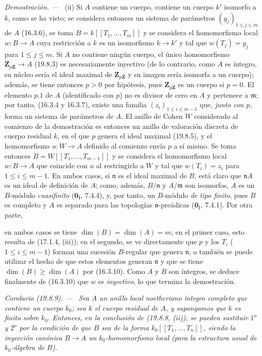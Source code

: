 \documentclass[10pt,oneside]{book}
\makeatletter
\newcommand{\setmanualcurrentlabel}[1]{\def\@currentlabel{#1}}
\newcommand{\oldpage}[2][]{%
  \setcounter{footnote}{0}%
  \marginpar{\scriptsize\textbf{#1}~|~#2}\ignorespaces}
\newenvironment{corollary}[1][]{%
  \setmanualcurrentlabel{#1}\par\medskip\noindent\itshape Corolario (#1). ---\ }{\par}
\newenvironment{proof}{%
  \par\medskip\noindent\textit{Demostración. ---\ }}{\par}
\providecommand{\setmin}{-}%
\makeatother
\begin{document}
\begin{proof}
\medskip
\noindent(ii)\enspace
Si $A$ contiene un cuerpo, contiene un cuerpo $k'$ isomorfo a $k$, como se ha
visto; se considera entonces un sistema de parámetros
$(y_j)_{1\leq j\leq m}$ de $A$ (16.3.6), se toma
$B=k[[T_1,\ldots,T_m]]$ y se considera el homomorfismo local $w:B\to A$ cuya
restricción a $k$ es un isomorfismo $k\to k'$ y tal que
$w(T_j)=y_j$ para $1\leq j\leq m$. Si $A$ no contiene ningún cuerpo, el único
homomorfismo $\mathbf Z_{p\mathbf Z}\to A$ (19.8.3) es necesariamente
inyectivo (de lo contrario, como $A$ es íntegro, su núcleo sería el ideal
maximal de $\mathbf Z_{p\mathbf Z}$ y su imagen sería isomorfa a un cuerpo);
además, se tiene entonces $p>0$ por hipótesis, pues
$\mathbf Z_{p\mathbf Z}$ es un cuerpo si $p=0$. El elemento $p.1$ de $A$
(identificado con $p$) no es divisor de cero en $A$ y pertenece a
$\mathfrak m$; por tanto, (16.3.4 y 16.3.7), existe una familia
$(z_i)_{1\leq i\leq m-1}$ que, \emph{junto con $p$}, forma un sistema de parámetros
de $A$. El anillo de Cohen $W$ considerado al comienzo de la demostración es
entonces un anillo de valoración discreta de cuerpo residual $k$, en el que
$p$ genera el ideal maximal (19.8.5), y el homomorfismo $u:W\to A$
definido al comienzo envía $p$ a sí mismo. Se toma entonces
$B=W[[T_1,\ldots,T_{m-1}]]$ y se considera el homomorfismo local $w:B\to A$
que coincide con $u$ al restringirlo a $W$ y tal que $w(T_i)=z_i$ para
$1\leq i\leq m\setmin 1$. En ambos casos, si $\mathfrak n$ es el ideal maximal de
$B$, está claro que $\mathfrak nA$ es un ideal de definición de $A$; como,
además, $B/\mathfrak n$ y $A/\mathfrak m$ son isomorfos, $A$ es un
$B$-módulo \emph{cuasifinito} ($\mathbf 0_{\mathrm I}$, 7.4.4), y, por tanto, un
$B$-módulo \emph{de tipo finito}, pues $B$ es completo y $A$ es
separado para las topologías $\mathfrak n$-preádicas
($\mathbf 0_{\mathrm I}$, 7.4.1). Por otra
parte,

\oldpage[0\textsubscript{IV-1}]{113}

en ambos casos se tiene $\dim(B)=\dim(A)=m$; en el primer caso, esto resulta
de (17.1.4, (iii)); en el segundo, se ve directamente que $p$ y los $T_i$
($1\leq i\leq m\setmin 1$) forman una sucesión $B$-regular que genera $\mathfrak n$,
o también se puede utilizar el hecho de que estos elementos generan
$\mathfrak n$ y que se tiene $\dim(B)\geq\dim(A)$ por (16.3.10). Como $A$ y
$B$ son íntegros, se deduce finalmente de (16.3.10) que $w$ es \emph{inyectivo}, lo
que termina la demostración.
\end{proof}

\begin{corollary}[19.8.9]
\label{0.19.8.9-es}
Sea $A$ un anillo local noetheriano íntegro completo que contiene un cuerpo
$k_0$; sea $k$ el cuerpo residual de $A$, y supongamos que $k$ es finito sobre
$k_0$. Entonces, en la conclusión de \textup{(19.8.8, (ii))}, se pueden sustituir
$1^{\mathrm o}$ y $2^{\mathrm o}$ por la condición de que $B$ sea de la forma
$k_0[[T_1,\ldots,T_n]]$, siendo la inyección canónica $B\to A$ un
$k_0$-homomorfismo local (para la estructura usual de $k_0$-álgebra de $B$).
\end{corollary}
\end{document}
